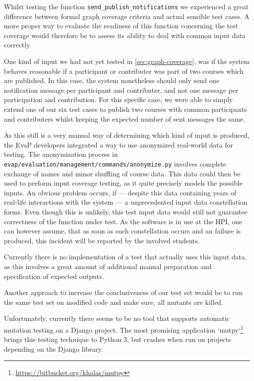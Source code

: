 Whilst testing the function \texttt{send\_publish\_notifications} we experienced a great difference between formal graph coverage criteria and actual sensible test cases.
A more proper way to evaluate the readiness of this function concerning the test coverage would therefore be to assess its ability to deal with common input data correctly.

One kind of input we had not yet tested in \autoref{sec:graph-coverage}, was if the system behaves reasonable if a participant or contributer was part of two courses which are published.
In this case, the system nonetheless should only send one notification message per participant and contributer, and not one message per participation and contribution.
For this specific case, we were able to simply extend one of our six test cases to publish two courses with common participants and contributers whilst keeping the expected number of sent messages the same.

As this still is a very manual way of determining which kind of input is produced, the EvaP developers integrated a way to use anonymized real-world data for testing.
The anonymization process in \texttt{evap/evaluation/management/commands/anonymize.py} involves complete exchange of names and minor shuffling of course data.
This data could then be used to perform input coverage testing, as it quite precisely models the possible inputs.
An obvious problem occurs, if --- despite this data containing years of real-life interactions with the system --- a unprecedented input data constellation forms.
Even though this is unlikely, this test input data would still not guarantee correctness of the function under test.
As the software is in use at the HPI, one can however assume, that as soon as such constellation occurs and an failure is produced, this incident will be reported by the involved students.

Currently there is no implementation of a test that actually uses this input data, as this involves a great amount of additional manual preparation and specification of expected outputs.

Another approach to increase the conclusiveness of our test set would be to run the same test set on modified code and make sure, all mutants are killed.

Unfortunately, currently there seems to be no tool that supports automatic mutation testing on a Django project.
The most promising application `mutpy`\footnote{\url{https://bitbucket.org/khalas/mutpy}} brings this testing technique to Python 3, but crashes when run on projects depending on the Django library.


